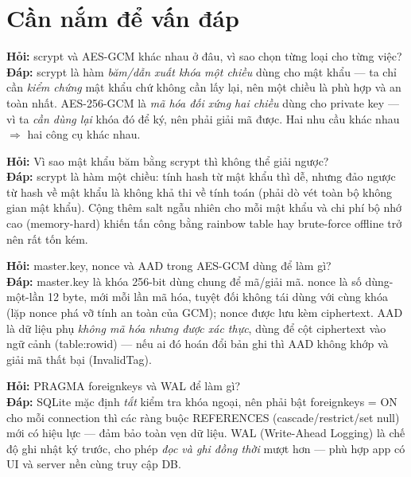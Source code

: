 \documentclass[12pt,a4paper]{article}
\newcommand{\code}[1]{{\ttfamily\small\def\_{\textunderscore\discretionary{}{}{}}#1}}
\begin{document}
\section{Cần nắm để vấn đáp}

\begin{qabox}
\textbf{Hỏi:} scrypt và AES-GCM khác nhau ở đâu, vì sao chọn từng loại cho từng
việc?\\[2pt]
\textbf{Đáp:} scrypt là hàm \emph{băm/dẫn xuất khóa một chiều} dùng cho mật khẩu —
ta chỉ cần \emph{kiểm chứng} mật khẩu chứ không cần lấy lại, nên một chiều là phù
hợp và an toàn nhất. AES-256-GCM là \emph{mã hóa đối xứng hai chiều} dùng cho
private key — vì ta \emph{cần dùng lại} khóa đó để ký, nên phải giải mã được. Hai
nhu cầu khác nhau $\Rightarrow$ hai công cụ khác nhau.
\end{qabox}

\begin{qabox}
\textbf{Hỏi:} Vì sao mật khẩu băm bằng scrypt thì không thể giải ngược?\\[2pt]
\textbf{Đáp:} scrypt là hàm một chiều: tính hash từ mật khẩu thì dễ, nhưng đảo
ngược từ hash về mật khẩu là không khả thi về tính toán (phải dò vét toàn bộ không
gian mật khẩu). Cộng thêm salt ngẫu nhiên cho mỗi mật khẩu và chi phí bộ nhớ cao
(memory-hard) khiến tấn công bằng rainbow table hay brute-force offline trở nên
rất tốn kém.
\end{qabox}

\begin{qabox}
\textbf{Hỏi:} \code{master.key}, nonce và AAD trong AES-GCM dùng để làm gì?\\[2pt]
\textbf{Đáp:} \code{master.key} là khóa 256-bit dùng chung để mã/giải mã. nonce
là số dùng-một-lần 12 byte, mới mỗi lần mã hóa, tuyệt đối không tái dùng với cùng
khóa (lặp nonce phá vỡ tính an toàn của GCM); nonce được lưu kèm ciphertext. AAD
là dữ liệu phụ \emph{không mã hóa nhưng được xác thực}, dùng để cột ciphertext vào
ngữ cảnh (\code{table:row\_id}) — nếu ai đó hoán đổi bản ghi thì AAD không khớp và
giải mã thất bại (\code{InvalidTag}).
\end{qabox}

\begin{qabox}
\textbf{Hỏi:} \code{PRAGMA foreign\_keys} và WAL để làm gì?\\[2pt]
\textbf{Đáp:} SQLite mặc định \emph{tắt} kiểm tra khóa ngoại, nên phải bật
\code{foreign\_keys = ON} cho mỗi connection thì các ràng buộc \code{REFERENCES}
(cascade/restrict/set null) mới có hiệu lực — đảm bảo toàn vẹn dữ liệu. WAL
(Write-Ahead Logging) là chế độ ghi nhật ký trước, cho phép \emph{đọc và ghi đồng
thời} mượt hơn — phù hợp app có UI và server nền cùng truy cập DB.
\end{qabox}
\end{document}
